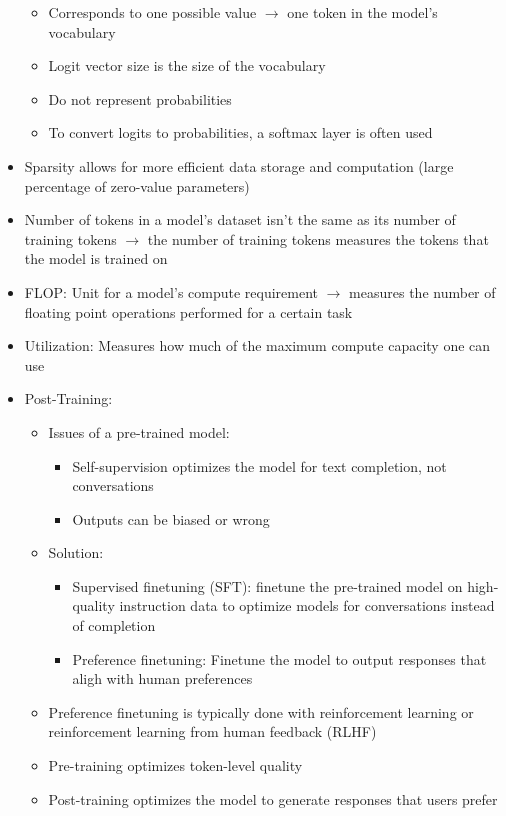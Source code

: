 \documentclass[11pt]{scrartcl}
\begin{document}
\begin{itemize}
\begin{itemize}
		\item Corresponds to one possible value $\to$ one token in the model's vocabulary
		\item Logit vector size is the size of the vocabulary
		\item Do not represent probabilities
		\item To convert logits to probabilities, a softmax layer is often used
	\end{itemize}
	\item Sparsity allows for more efficient data storage and computation (large percentage of zero-value parameters)
	\item Number of tokens in a model's dataset isn't the same as its number of training tokens $\to$ the number of training tokens measures the tokens that the model is trained on
	\item FLOP: Unit for a model's compute requirement $\to$ measures the number of floating point operations performed for a certain task
	\item Utilization: Measures how much of the maximum compute capacity one can use
	\item Post-Training:
	\begin{itemize}
		\item Issues of a pre-trained model: 
		\begin{itemize}
			\item Self-supervision optimizes the model for text completion, not conversations
			\item Outputs can be biased or wrong
		\end{itemize}
		\item Solution:
		\begin{itemize}
			\item Supervised finetuning (SFT): finetune the pre-trained model on high-quality instruction data to optimize models for conversations instead of completion
			\item Preference finetuning: Finetune the model to output responses that aligh with human preferences
		\end{itemize}
		\item Preference finetuning is typically done with reinforcement learning or reinforcement learning from human feedback (RLHF)
		\item Pre-training optimizes token-level quality
		\item Post-training optimizes the model to generate responses that users prefer
	\end{itemize}

\end{itemize}
\end{document}
